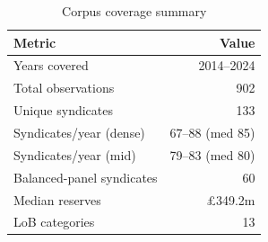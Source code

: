 \begin{table}[htbp]
\centering
\caption{Corpus coverage summary}
\label{tab:corpus_coverage}
\begin{tabular}{lr}
\toprule
\textbf{Metric} & \textbf{Value} \\
\midrule
Years covered & 2014--2024 \\
Total observations & 902 \\
Unique syndicates & 133 \\
Syndicates/year (dense) & 67--88 (med 85) \\
Syndicates/year (mid) & 79--83 (med 80) \\
Balanced-panel syndicates & 60 \\
Median reserves & \pounds349.2m \\
LoB categories & 13 \\
\bottomrule
\end{tabular}
\end{table}
